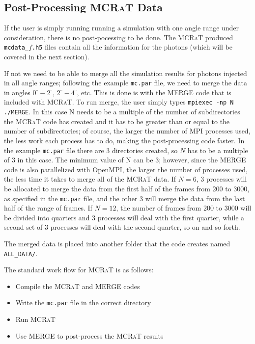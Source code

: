 \documentclass[12pt,a4paper]{article}
\newcommand{\mcrat}{\textsc{MCRaT}}
\begin{document}
 \subsection{Post-Processing \mcrat{} Data}
 If the user is simply running running a simulation with one angle range under consideration, there is no post-pocessing to be done. The \mcrat{} produced \texttt{mcdata\_$f$.h5} files contain all the information for the photons (which will be covered in the next section).
 
 If not we need to be able to merge all the simulation results for photons injected in all angle ranges; following the example \texttt{mc.par} file, we need to merge the data in angles $0^\circ-2^\circ$, $2^\circ-4^\circ$, etc. This is done is with the MERGE code that is included with \mcrat{}. To run merge, the user simply types \texttt{mpiexec -np N ./MERGE}. In this case N needs to be a multiple of the number of subdirectories the \mcrat{} code has created and it has to be greater than or equal to the number of subdirectories; of course, the larger the number of MPI processes used, the less work each process has to do, making the post-processing code faster. In the example \texttt{mc.par} file there are 3 directories created, so $N$ has to be a multiple of 3 in this case. The minimum value of N can be $3$; however, since the MERGE code is also parallelized with OpenMPI, the larger the number of processes used, the less time it takes to merge all of the \mcrat{} data.  If $N=6$, 3 processes will be allocated to merge the data from the first half of the frames from 200 to 3000, as specified in the \texttt{mc.par} file, and the other 3 will merge the data from the last half of the range of frames. If $N=12$, the number of frames from 200 to 3000 will be divided into quarters and 3 processes will deal with the first quarter, while a second set of 3 processes will deal with the second quarter, so on and so forth. 
 
 The merged data is placed into another folder that the code creates named \texttt{ALL\_DATA/}. \newline
 
 \noindent The standard work flow for \mcrat{} is as follows:
 \begin{itemize}
 \item[1.] Compile the \mcrat{} and MERGE codes
 \item[2.] Write the \texttt{mc.par} file in the correct directory
 \item[3.] Run \mcrat{}
 \item[4.] Use MERGE to post-process the \mcrat{} results
 \end{itemize}
 
\end{document}
